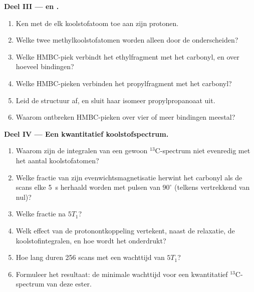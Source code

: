 \begin{problem}
\medskip\noindent\textbf{Deel III ---  en .}
\begin{enumerate}[resume]
  \item Ken met de  elk koolstofatoom toe aan zijn protonen.
  \item Welke twee methylkoolstofatomen worden alleen door de 
        onderscheiden?
  \item Welke HMBC-piek verbindt het ethylfragment met het carbonyl, en
        over hoeveel bindingen?
  \item Welke HMBC-pieken verbinden het propylfragment met het carbonyl?
  \item Leid de structuur af, en sluit haar isomeer propylpropanoaat uit.
  \item Waarom ontbreken HMBC-pieken over vier of meer bindingen meestal?
\end{enumerate}

\medskip\noindent\textbf{Deel IV --- Een kwantitatief koolstofspectrum.}
\begin{enumerate}[resume]
  \item Waarom zijn de integralen van een gewoon ${}^{13}$C-spectrum niet
        evenredig met het aantal koolstofatomen?
  \item Welke fractie van zijn evenwichtsmagnetisatie herwint het carbonyl
        als de scans elke \qty{5}{s} herhaald worden met pulsen van
        $90^\circ$ (telkens vertrekkend van nul)?
  \item Welke fractie na $5T_1$?
  \item Welk effect van de protonontkoppeling vertekent, naast de relaxatie,
        de koolstofintegralen, en hoe wordt het onderdrukt?
  \item Hoe lang duren 256 scans met een wachttijd van $5T_1$?
  \item Formuleer het resultaat: de minimale wachttijd voor een
        kwantitatief ${}^{13}$C-spectrum van deze ester.
\end{enumerate}
\end{problem}
